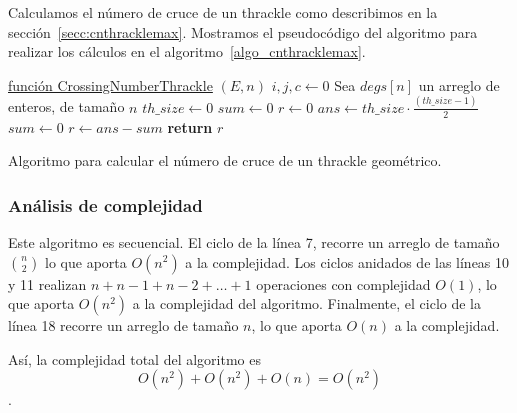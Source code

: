   Calculamos el número de cruce de un thrackle como describimos en la sección~\ref{secc:cnthracklemax}. Mostramos el pseudocódigo del algoritmo para realizar los cálculos en el algoritmo~\ref{algo_cnthracklemax}.

  \begin{algorithm}[b]
    \DontPrintSemicolon
    \underline{función CrossingNumberThrackle} $(E,n)$\;
     $i,j,c \gets 0$\;
     Sea $degs[n]$ un arreglo de enteros, de tamaño $n$\;
     $th\_size \gets 0$\;
     $sum \gets 0$\;
     $r \gets 0$\;
     $ans \gets th\_size\cdot \frac{(th\_size-1)}{2}$\;
     $sum \gets 0$\;
     $r \gets ans-sum$\;
     \textbf{return} $r$\;
    \caption{Algoritmo para calcular el número de cruce de un thrackle geométrico.}
    \label{algo_cnthracklemax}
  \end{algorithm}

  \subsubsection{Análisis de complejidad}

  Este algoritmo es secuencial. El ciclo de la línea 7, recorre un arreglo de tamaño
  $\binom{n}{2}$ lo que aporta $O(n^2)$ a la complejidad. Los ciclos anidados de las
  líneas 10 y 11 realizan $n + n-1 + n-2 + \dots + 1$ operaciones con complejidad $O(1)$,
  lo que aporta $O(n^2)$  a la complejidad del algoritmo. Finalmente, el ciclo de la
  línea 18 recorre un arreglo de tamaño $n$, lo que aporta $O(n)$ a la complejidad.

  Así, la complejidad total del algoritmo es \[ O(n^2) + O(n^2) + O(n) = O(n^2)\].
